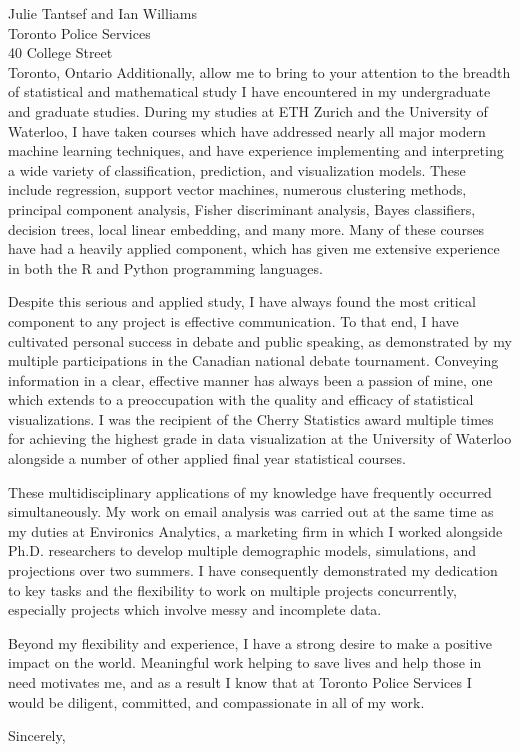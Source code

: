 \documentclass[11pt,a4paper,sans]{letter}
\begin{document}
\begin{letter}{Julie Tantsef and Ian Williams \\ Toronto Police Services \\ 40 College Street \\ Toronto, Ontario}
		Additionally, allow me to bring to your attention to the breadth of statistical and mathematical study I have encountered in my undergraduate and graduate studies. During my studies at ETH Zurich and the University of Waterloo, I have taken courses which have addressed nearly all major modern machine learning techniques, and have experience implementing and interpreting a wide variety of classification, prediction, and visualization models. These include regression, support vector machines, numerous clustering methods, principal component analysis, Fisher discriminant analysis, Bayes classifiers, decision trees, local linear embedding, and many more. Many of these courses have had a heavily applied component, which has given me extensive experience in both the R and Python programming languages.
		
		Despite this serious and applied study, I have always found the most critical component to any project is effective communication. To that end, I have cultivated personal success in debate and public speaking, as demonstrated by my multiple participations in the Canadian national debate tournament. Conveying information in a clear, effective manner has always been a passion of mine, one which extends to a preoccupation with the quality and efficacy of statistical visualizations. I was the recipient of the Cherry Statistics award multiple times for achieving the highest grade in data visualization at the University of Waterloo alongside a number of other applied final year statistical courses.
		
		These multidisciplinary applications of my knowledge have frequently occurred simultaneously. My work on email analysis was carried out at the same time as my duties at Environics Analytics, a marketing firm in which I worked alongside Ph.D. researchers to develop multiple demographic models, simulations, and projections over two summers. I have consequently demonstrated my dedication to key tasks and the flexibility to work on multiple projects concurrently, especially projects which involve messy and incomplete data.
		
		Beyond my flexibility and experience, I have a strong desire to make a positive impact on the world. Meaningful work helping to save lives and help those in need motivates me, and as a result I know that at Toronto Police Services I would be diligent, committed, and compassionate in all of my work.
		
		
		
		\closing{Sincerely,}
	\end{letter}
\end{document}
